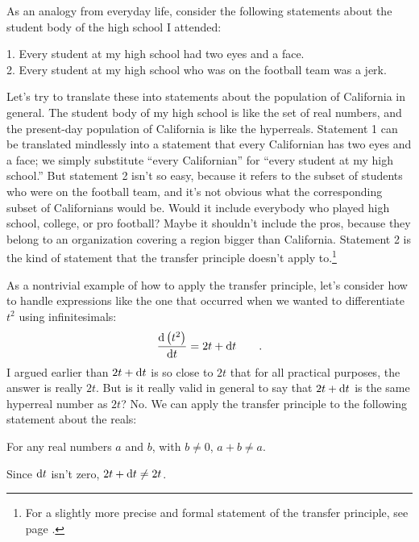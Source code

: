 As an analogy from everyday life, consider the following statements about the student body of the
high school I attended:

\begin{indentedblock}
1. Every student at my high school had two eyes and a face.\\
2. Every student at my high school who was on the football team was a jerk.
\end{indentedblock}

Let's try to translate these into statements about the population of California in general.
The student body of my high school is like the set of real numbers, and the present-day population
of California is like the hyperreals. Statement 1 can be translated mindlessly into a statement
that every Californian has two eyes and a face; we simply substitute ``every Californian'' for
``every student at my high school.'' But statement 2 isn't so easy, because it refers to the
subset of students who were on the football team, and it's not obvious what the corresponding
subset of Californians would be. Would it include everybody who played high school, college,
or pro football? Maybe it shouldn't include the pros, because they belong to an organization
covering a region bigger than California. Statement 2 is the kind of statement that the
transfer principle doesn't apply to.\footnote{For a slightly more precise and formal statement
of the transfer principle, see page \pageref{transfer}.}\label{backref-transfer}

\begin{eg}\label{eg:halo}
As a nontrivial example of how to apply the transfer principle, let's consider how to handle
expressions like the one that occurred when we wanted to differentiate $t^2$ using infinitesimals:
\begin{equation*}
  \frac{\textup{d} \left(t^2\right)}{\textup{d} t} = 2t+\textup{d} t  \qquad .
\end{equation*}
I argued earlier than $2t+\textup{d} t$ is so close to $2t$ that for all practical purposes, the
answer is really $2t$. But is it really valid in general to say that $2t+\textup{d} t$ is the
same hyperreal number as $2t$? No. We can apply the transfer principle to the
following statement about the reals:

\begin{indentedblock}
For any real numbers $a$ and $b$, with $b\ne 0$, $a+b\ne a$.
\end{indentedblock}

Since $\textup{d} t$ isn't zero, $2t+\textup{d} t\ne 2t$.
\end{eg}

